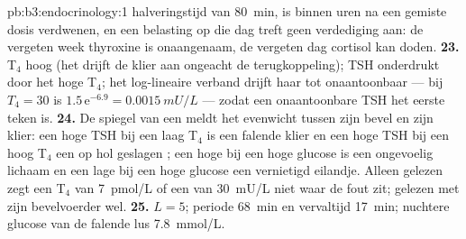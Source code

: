\begin{solution}{pb:b3:endocrinology:1}
halveringstijd van \qty{80}{min}, is binnen uren na een gemiste dosis
verdwenen, en een belasting op die dag treft geen verdediging aan: de
vergeten week thyroxine is onaangenaam, de vergeten dag cortisol kan
doden.
\textbf{23.} T$_{4}$ hoog (het  drijft de klier aan ongeacht
de terugkoppeling); TSH onderdrukt door het hoge T$_{4}$; het
log-lineaire verband drijft haar tot onaantoonbaar --- bij $T_{4} = 30$
is $1.5\,\mathrm{e}^{-6.9}
= \qty{0.0015}{mU/L}$ --- zodat een onaantoonbare TSH het eerste teken
is.
\textbf{24.} De spiegel van een  meldt het evenwicht tussen zijn
bevel en zijn klier: een hoge TSH bij een laag T$_{4}$ is een falende
klier en een hoge TSH bij een hoog T$_{4}$ een op hol geslagen
; een hoge  bij een hoge glucose is een ongevoelig
lichaam en een lage  bij een hoge glucose een vernietigd
eilandje. Alleen gelezen zegt een T$_{4}$ van \qty{7}{pmol/L} of een
 van \qty{30}{mU/L} niet waar de fout zit; gelezen met zijn
bevelvoerder wel.
\textbf{25.}  $L = 5$; periode \qty{68}{min} en vervaltijd
\qty{17}{min}; nuchtere glucose van de falende lus \qty{7.8}{mmol/L}.
\end{solution}
